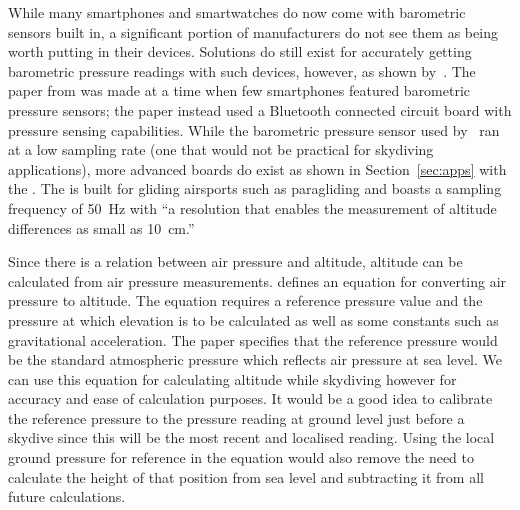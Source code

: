 \documentclass[11pt, twocolumn]{article}
\begin{document}
While many smartphones and smartwatches do now come with barometric sensors built in, a significant portion of manufacturers do not see them as being worth putting in their devices. Solutions do still exist for accurately getting barometric pressure readings with such devices, however, as shown by~\textcite{he_atmospheric_2012}. The paper from \citeyear{he_atmospheric_2012} was made at a time when few smartphones featured barometric pressure sensors; the paper instead used a Bluetooth connected circuit board with pressure sensing capabilities. While the barometric pressure sensor used by~\textcite{he_atmospheric_2012} ran at a low sampling rate (one that would not be practical for skydiving applications), more advanced boards do exist as shown in Section~\ref{sec:apps} with the .
The  is built for gliding airsports such as paragliding and boasts a sampling frequency of \SI{50}{\Hz} with ``a resolution that enables the measurement of altitude differences as small as \SI{10}{\cm}.''

Since there is a relation between air pressure and altitude, altitude can be calculated from air pressure measurements. \textcite{liu_beyond_2014} defines an equation for converting air pressure to altitude. The equation requires a reference pressure value and the pressure at which elevation is to be calculated as well as some constants such as gravitational acceleration. The paper specifies that the reference pressure would be the standard atmospheric pressure which reflects air pressure at sea level. We can use this equation for calculating altitude while skydiving however for accuracy and ease of calculation purposes. It would be a good idea to calibrate the reference pressure to the pressure reading at ground level just before a skydive since this will be the most recent and localised reading. Using the local ground pressure for reference in the equation would also remove the need to calculate the height of that position from sea level and subtracting it from all future calculations.
\end{document}

